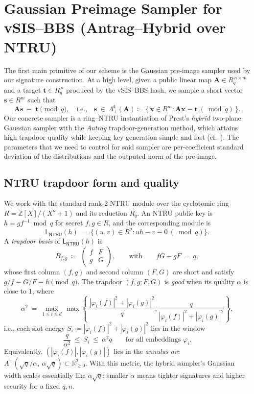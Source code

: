 \section{Gaussian Preimage Sampler for vSIS–BBS (Antrag–Hybrid over NTRU)}
\label{sec:gaussian-preimage}

The first main primitive of our scheme is the Gaussian pre-image sampler used by our signature construction.
At a high level, given a public linear map \(\mathbf{A}\in R_q^{\,n\times m}\) and a target \(\mathbf{t}\in R_q^{\,n}\) produced by the vSIS–BBS hash, we sample a short vector \(\mathbf{s}\in R^{m}\) such that
\[
  \mathbf{A}\mathbf{s}\ \equiv\ \mathbf{t}\pmod q,
\quad\text{i.e.,}\quad
  \mathbf{s}\ \in\ \Lambda_{\perp}^{\mathbf{t}}(\mathbf{A}) \coloneqq \{\,\mathbf{x}\in R^{m}:\mathbf{A}\mathbf{x}\equiv\mathbf{t}\ (\bmod q)\,\}.
\]
Our concrete sampler is a ring–NTRU instantiation of Prest’s \emph{hybrid} two-plane Gaussian sampler with the \emph{Antrag} trapdoor-generation method, which attains high trapdoor quality while keeping key generation simple and fast (cf.\ \cite{cryptoeprint:2025/356}). The parameters that we need to control for said sampler are per-coefficient standard deviation of the distributions and the outputed norm of the pre-image. 


\subsection{NTRU trapdoor form and quality}
\label{subsec:trapdoor-form}

We work with the standard rank-2 NTRU module over the cyclotomic ring \(R=\mathbb{Z}[X]/(X^n+1)\) and its reduction \(R_q\).  An NTRU public key is \(h=g f^{-1}\bmod q\) for secret \(f,g\in R\), and the corresponding module is
\[
  \mathsf{L}_{\mathsf{NTRU}}(h)\ =\ \{(u,v)\in R^2 : u h - v \equiv 0 \ (\bmod q)\}.
\]
A \emph{trapdoor basis} of \(\mathsf{L}_{\mathsf{NTRU}}(h)\) is
\[
  B_{f,g}\ \coloneqq\
  \begin{pmatrix}
    f & F\\[2pt]
    g & G
  \end{pmatrix},
  \qquad\text{with}\qquad fG - gF \ =\ q,
\]
whose first column \((f,g)\) and second column \((F,G)\) are short and satisfy \(g/f \equiv G/F \equiv h \pmod q\).  The trapdoor \((f,g;F,G)\) is \emph{good} when its quality \(\alpha\) is close to \(1\), where
\[
  \alpha^{2}\ =\ \max_{1\le i\le d}\, 
  \max\!\left\{\
    \frac{|{\varphi_i(f)}|^2+|{\varphi_i(g)}|^2}{q},
    \frac{q}{|{\varphi_i(f)}|^2+|{\varphi_i(g)}|^2}
  \right\},
\]
i.e., each slot energy \(S_i\coloneqq |{\varphi_i(f)}|^2+|{\varphi_i(g)}|^2\) lies in the window
\[
  \frac{q}{\alpha^2}\ \le\ S_i\ \le\ \alpha^2 q
  \qquad\text{for all embeddings } \varphi_i.
\]
Equivalently, \((|\varphi_i(f)|,|\varphi_i(g)|)\) lies in the \emph{annulus arc}
\(A^+(\sqrt{q}/\alpha,\ \alpha\sqrt{q})\subset\mathbb{R}_{\ge0}^2\).  With this metric, the hybrid sampler’s Gaussian width scales essentially like \(\alpha\sqrt{q}\): smaller \(\alpha\) means tighter signatures and higher security for a fixed \(q,n\).

